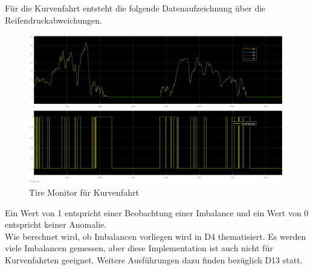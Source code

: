 Für die Kurvenfahrt entsteht die folgende Datenaufzeichnung über die Reifendruckabweichungen.
\begin{figure}[H]
	\centering
	\includegraphics[width=0.95\linewidth]{../Graphiken/CurvesTireMonitor.png}
	\caption{Tire Monitor für Kurvenfahrt}
\end{figure}
Ein Wert von 1  entspricht einer Beobachtung einer Imbalance und ein Wert von 0 entspricht keiner Anomalie.
\\
Wie berechnet wird, ob Imbalancen vorliegen wird in D4 thematisiert. Es werden viele Imbalancen gemessen, aber diese Implementation ist auch nicht für Kurvenfahrten geeignet. Weitere Ausführungen dazu finden bezüglich D13 statt.










	
	

	
	
	
	